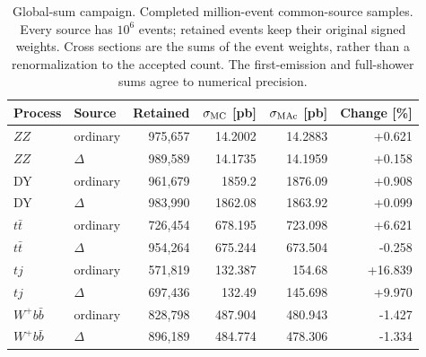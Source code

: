 \begin{table}[tbp]
\centering\small
\begin{tabular}{llrrrr}
\toprule
Process & Source & Retained & $\sigma_{\rm MC}$ [pb] & $\sigma_{\rm MAc}$ [pb] & Change [\%]\\
\midrule
$ZZ$ & ordinary & 975,657 & 14.2002 & 14.2883 & +0.621\\
$ZZ$ & $\Delta$ & 989,589 & 14.1735 & 14.1959 & +0.158\\
DY & ordinary & 961,679 & 1859.2 & 1876.09 & +0.908\\
DY & $\Delta$ & 983,990 & 1862.08 & 1863.92 & +0.099\\
$t\bar t$ & ordinary & 726,454 & 678.195 & 723.098 & +6.621\\
$t\bar t$ & $\Delta$ & 954,264 & 675.244 & 673.504 & -0.258\\
$tj$ & ordinary & 571,819 & 132.387 & 154.68 & +16.839\\
$tj$ & $\Delta$ & 697,436 & 132.49 & 145.698 & +9.970\\
$W^+b\bar b$ & ordinary & 828,798 & 487.904 & 480.943 & -1.427\\
$W^+b\bar b$ & $\Delta$ & 896,189 & 484.774 & 478.306 & -1.334\\
\bottomrule
\end{tabular}
\caption{Global-sum campaign. Completed million-event common-source samples. Every source has $10^6$ events; retained events keep their original signed weights. Cross sections are the sums of the event weights, rather than a renormalization to the accepted count. The first-emission and full-shower sums agree to numerical precision.}
\label{tab:rates}
\end{table}

